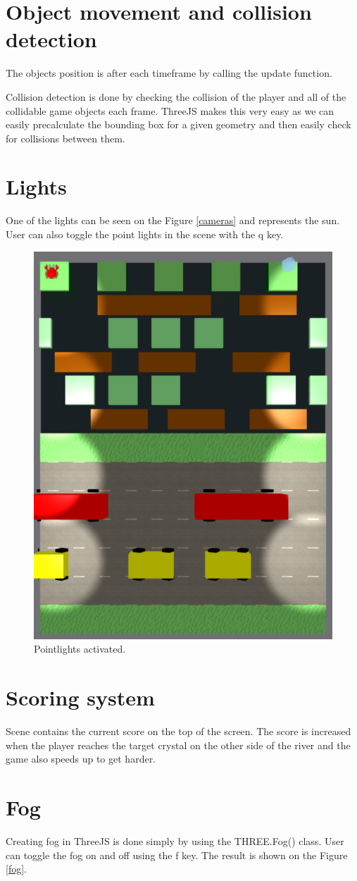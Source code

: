 \documentclass[a4paper,10pt]{article}
\begin{document}
\section{Object movement and collision detection}
The objects position is after each timeframe by calling the update function.

Collision detection is done by checking the collision of the player and all of the collidable game objects each frame. ThreeJS makes this very easy as we can easily precalculate the bounding box for a given geometry and then easily check for collisions between them. 


\section{Lights}
One of the lights can be seen on the Figure \ref{cameras} and represents the sun. User can also toggle the point lights in the scene with the q key.

\begin{figure}[!htb]
	\centering
 	\includegraphics[width=0.3\linewidth]{images/pointlights.png}
  	\caption{Pointlights activated.}
	\label{pointlights}
\end{figure}

\section{Scoring system}
Scene contains the current score on the top of the screen. The score is increased when the player reaches the target crystal on the other side of the river and the game also speeds up to get harder.

\section{Fog}
Creating fog in ThreeJS is done simply by using the THREE.Fog() class. User can toggle the fog on and off using the f key. The result is shown on the Figure \ref{fog}.
\end{document}
